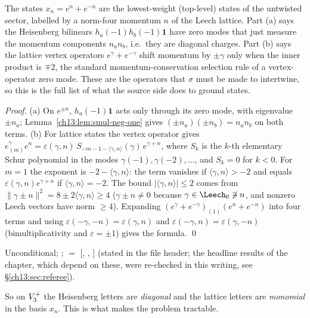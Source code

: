 \begin{physics}
The states $x_n=e^n+e^{-n}$ are the lowest-weight (top-level) states of the untwisted sector, labelled by a norm-four momentum $n$ of the Leech lattice. Part (a) says the Heisenberg bilinears $h_a(-1)h_b(-1)\mathbf 1$ have zero modes that just measure the momentum components $n_an_b$, i.e.\ they are diagonal charges. Part (b) says the lattice vertex operators $e^\gamma+e^{-\gamma}$ shift momentum by $\pm\gamma$ only when the inner product is $\mp2$, the standard momentum-conservation selection rule of a vertex-operator zero mode. These are the operators that $\sigma$ must be made to intertwine, so this is the full list of what the source side does to ground states.
\end{physics}
\noindent\emph{Proof.} (a) On $e^{\pm n}$, $h_a(-1)\mathbf 1$ acts only through its zero mode, with
eigenvalue $\pm n_a$; Lemma~\ref{ch13:lem:smul-neg-one} gives $(\pm n_a)(\pm n_b)=n_an_b$ on both terms.
(b) For lattice states the vertex operator gives
$e^\gamma_{(m)}e^n=\varepsilon(\gamma,n)\,S_{-m-1-\langle\gamma,n\rangle}(\gamma)\,e^{\gamma+n}$, where $S_k$ is the
$k$-th elementary Schur polynomial in the modes $\gamma(-1),\gamma(-2),\dots$, and $S_k=0$ for $k<0$. For
$m=1$ the exponent is $-2-\langle\gamma,n\rangle$: the term vanishes if $\langle\gamma,n\rangle>-2$ and equals
$\varepsilon(\gamma,n)e^{\gamma+n}$ if $\langle\gamma,n\rangle=-2$. The bound $|\langle\gamma,n\rangle|\le2$ comes from
$\|\gamma\pm n\|^2=8\pm2\langle\gamma,n\rangle\ge4$ ($\gamma\pm n\ne0$ because $\gamma\in\Leech_0\not\ni n$, and
nonzero Leech vectors have norm $\ge4$). Expanding $(e^\gamma+e^{-\gamma})_{(1)}(e^{n}+e^{-n})$ into four terms
and using $\varepsilon(-\gamma,-n)=\varepsilon(\gamma,n)$ and $\varepsilon(-\gamma,n)=\varepsilon(\gamma,-n)$ (bimultiplicativity
and $\varepsilon=\pm1$) gives the formula. \qed
\begin{status}
Unconditional; ;  $=$
[, , ] (stated in the file header; the
headline results of the chapter, which depend on these, were re-checked in this writing, see
\S\ref{ch13:sec:referee}).
\end{status}

So on $V_3^{+}$ the Heisenberg letters are \emph{diagonal} and the lattice letters are
\emph{monomial} in the basis $x_n$. This is what makes the problem tractable.

